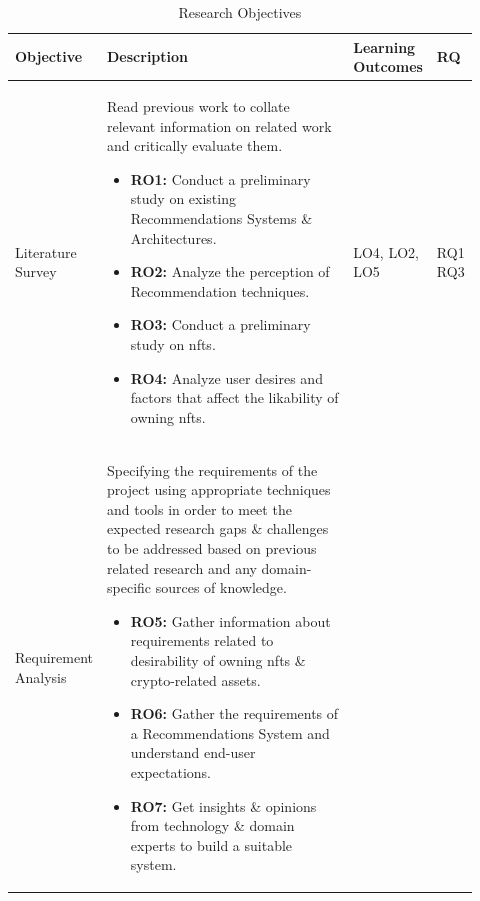 \begin{longtable}{| p{0.135\linewidth} | p{0.63\linewidth}| p{0.12\linewidth}| p{0.04\linewidth}|}
\caption{Research Objectives}
\label{tab:research-objectives-table}\\
\hline
Objective &   Description & Learning Outcomes & RQ \\ 
\hline
Literature Survey & Read previous work to collate relevant information on related work and critically evaluate them.
\begin{itemize}
\item \textbf{RO1:} Conduct a preliminary study on existing Recommendations Systems \& Architectures.
\item \textbf{RO2:} Analyze the perception of Recommendation techniques.
\item \textbf{RO3:} Conduct a preliminary study on \Gls{nft}s.
\item \textbf{RO4:} Analyze user desires and factors that affect the likability of owning \Gls{nft}s.
\vspace{-7mm}       %
\end{itemize}
& LO4, LO2, LO5 
& RQ1 RQ3
\\
\hline
Requirement Analysis &  Specifying the requirements of the project using appropriate techniques and tools in order to meet the expected research gaps \& challenges to be addressed based on previous related research and any domain-specific sources of knowledge.
\begin{itemize}
\item \textbf{RO5:} Gather information about requirements related to desirability of owning \Gls{nft}s \& crypto-related assets.
\item \textbf{RO6:} Gather the requirements of a Recommendations System and understand end-user expectations.
\item \textbf{RO7:} Get insights \&  opinions from technology \& domain experts to build a suitable system.

\end{itemize}
\end{longtable}
